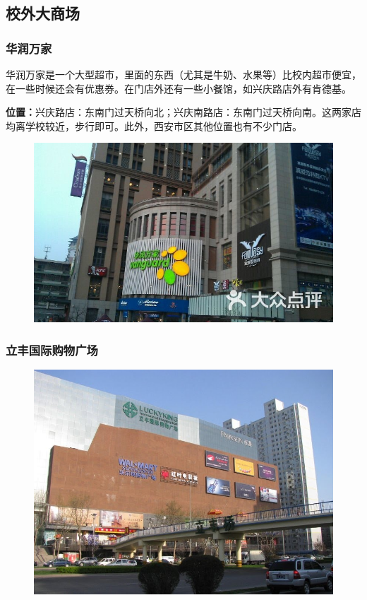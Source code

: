 \documentclass[
decoration,  %
]{qyxf-book}
\begin{document}
\subsection{校外大商场}
\subsubsection{华润万家}

华润万家是一个大型超市，里面的东西（尤其是牛奶、水果等）比校内超市便宜，在一些时候还会有优惠券。在门店外还有一些小餐馆，如兴庆路店外有肯德基。

\textbf{位置：}兴庆路店：东南门过天桥向北；兴庆南路店：东南门过天桥向南。这两家店均离学校较近，步行即可。此外，西安市区其他位置也有不少门店。



\begin{figure}[htbp]
	\centering
	\includegraphics[width=0.8\linewidth]{pics/image19.jpg}
\end{figure}

\subsubsection{立丰国际购物广场}



\begin{figure}[htbp]
	\centering
	\includegraphics[width=0.8\linewidth]{pics/image20.jpg}
\end{figure}
\end{document}
